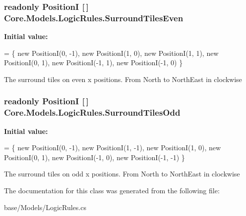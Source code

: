 \subsubsection[{Surround\+Tiles\+Even}]{\setlength{\rightskip}{0pt plus 5cm}readonly {\bf Position\+I} \mbox{[}$\,$\mbox{]} Core.\+Models.\+Logic\+Rules.\+Surround\+Tiles\+Even\hspace{0.3cm}{\ttfamily [static]}}\label{classCore_1_1Models_1_1LogicRules_a3d587d8f781d3b37c26c501d003f3d4d}
{\bfseries Initial value\+:}
\begin{DoxyCode}
=
        \{
            \textcolor{keyword}{new} PositionI(0, -1),
            \textcolor{keyword}{new} PositionI(1, 0),
            \textcolor{keyword}{new} PositionI(1, 1),
            \textcolor{keyword}{new} PositionI(0, 1),
            \textcolor{keyword}{new} PositionI(-1, 1),
            \textcolor{keyword}{new} PositionI(-1, 0)
        \}
\end{DoxyCode}


The surround tiles on even x positions. From North to North\+East in clockwise 

\hypertarget{classCore_1_1Models_1_1LogicRules_ae559d0e04d49b4cea7874d1e7ca5a5b2}{}
\subsubsection[{Surround\+Tiles\+Odd}]{\setlength{\rightskip}{0pt plus 5cm}readonly {\bf Position\+I} \mbox{[}$\,$\mbox{]} Core.\+Models.\+Logic\+Rules.\+Surround\+Tiles\+Odd\hspace{0.3cm}{\ttfamily [static]}}\label{classCore_1_1Models_1_1LogicRules_ae559d0e04d49b4cea7874d1e7ca5a5b2}
{\bfseries Initial value\+:}
\begin{DoxyCode}
=
        \{
            \textcolor{keyword}{new} PositionI(0, -1),
            \textcolor{keyword}{new} PositionI(1, -1),
            \textcolor{keyword}{new} PositionI(1, 0),
            \textcolor{keyword}{new} PositionI(0, 1),
            \textcolor{keyword}{new} PositionI(-1, 0),
            \textcolor{keyword}{new} PositionI(-1, -1)
        \}
\end{DoxyCode}


The surround tiles on odd x positions. From North to North\+East in clockwise 



The documentation for this class was generated from the following file\+:\begin{DoxyCompactItemize}
\item 
base/\+Models/Logic\+Rules.\+cs\end{DoxyCompactItemize}
